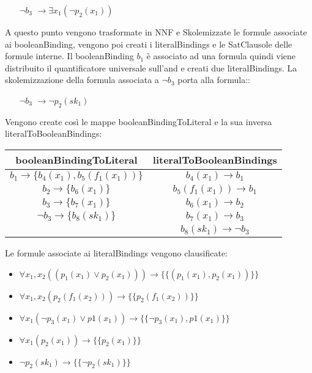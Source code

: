 \documentclass[./main.tex]{subfiles}
\begin{document}
\begin{itemize}
    \item [$\lnot b_3$] $\rightarrow \exists x_1(\lnot p_2(x_1))$
\end{itemize}

A questo punto vengono trasformate in NNF e Skolemizzate le formule associate ai booleanBinding,
vengono poi creati i literalBindings e le SatClausole delle formule interne.
Il booleanBinding $b_1$ è associato ad una formula \cb quindi 
viene distribuito il quantificatore universale sull'and e creati due literalBindings.
La skolemizzazione della formula associata a $\lnot b_3$ porta alla formula::
\begin{itemize}
    \item [$\lnot b_3$] $\rightarrow \lnot p_2(sk_1)$
\end{itemize}
Vengono create così le mappe booleanBindingToLiteral e la sua inversa literalToBooleanBindings:

\begin{table}[H]
    \centering
    \begin{tabular}{|c|c|}
        \hline
        \textbf{booleanBindingToLiteral} & \textbf{literalToBooleanBindings} \\
        \hline
        $b_1 \rightarrow \{b_4(x_1), b_5(f_1(x_1))\}$ & $b_4(x_1) \rightarrow b_1$\\
        $b_2 \rightarrow \{b_6(x_1)\}$ & $b_5(f_1(x_1)) \rightarrow b_1$ \\
        $b_3 \rightarrow \{b_7(x_1)\}$ & $b_6(x_1) \rightarrow b_2$ \\
        $\lnot b_3 \rightarrow \{b_8(sk_1)\}$ & $b_7(x_1) \rightarrow b_3$ \\
        & $b_8(sk_1) \rightarrow \lnot b_3$ \\
        \hline
    \end{tabular}
\end{table}

Le formule associate ai literalBindings vengono clausificate:

\begin{itemize}
    \item $\forall x_1, x_2 ((p_1(x_1) \lor p_2(x_1))) \rightarrow \{\{(p_1(x_1), p_2(x_1))\}\}$
    \item $\forall x_1, x_2 (p_2(f_1(x_2))) \rightarrow \{\{p_2(f_1(x_2))\}\}$
    \item $\forall x_1 (\lnot p_3(x_1) \lor p1(x_1)) \rightarrow \{\{\lnot p_3(x_1), p1(x_1)\}\}$
    \item $\forall x_1(p_2(x_1)) \rightarrow \{\{p_2(x_1)\}\}$
    \item $\lnot p_2(sk_1) \rightarrow \{\{\lnot p_2(sk_1)\}\}$
\end{itemize}
\end{document}
